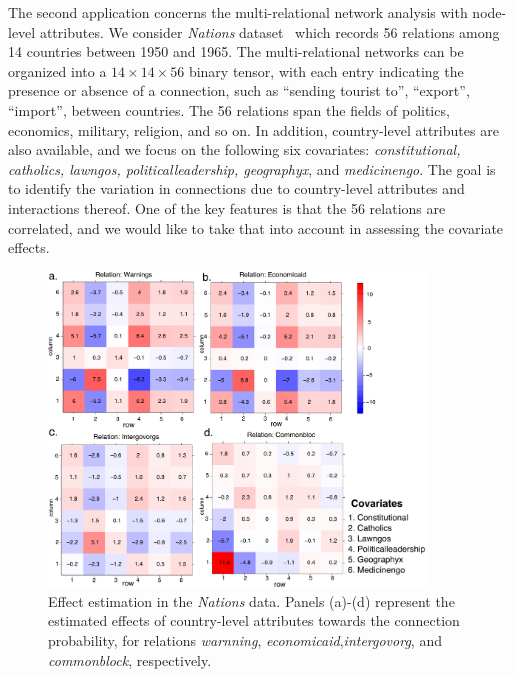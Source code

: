 \documentclass[12pt]{article}
\theoremstyle{plain}
\theoremstyle{definition}
\begin{document}
The second application concerns the multi-relational network analysis with node-level attributes. We consider \emph{Nations} dataset~\citep{nickel2011three} which records 56 relations among 14 countries between 1950 and 1965. The multi-relational networks can be organized into a $14 \times 14 \times 56$ binary tensor, with each entry indicating the presence or absence of a connection, such as ``sending tourist to'', ``export'', ``import'', between countries. The 56 relations span the fields of politics, economics, military, religion, and so on. In addition, country-level attributes are also available, and we focus on the following six covariates: \emph{constitutional, catholics, lawngos, politicalleadership, geographyx}, and \emph{medicinengo}. The goal is to identify the variation in connections due to country-level attributes and interactions thereof. One of the key features is that the 56 relations are correlated, and we would like to take that into account in assessing the covariate effects. 

\begin{figure}[H]
\centering
\includegraphics[width=10cm]{coef.pdf}
\caption{Effect estimation in the \emph{Nations} data. Panels (a)-(d) represent the estimated effects of country-level attributes towards the connection probability, for relations \emph{warnning}, \emph{economicaid},\emph{intergovorg}, and \emph{commonblock}, respectively. }\label{fig:est}

\end{figure}
\end{document}
